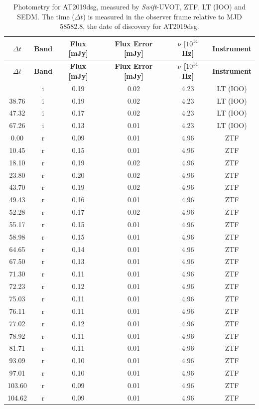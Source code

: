 \documentclass{nature_plusfigure}
\begin{document}
\begin{methods}
\newpage
\begin{longtable}{|c|c|c|c|c|c|}
\caption{Photometry for AT2019dsg, measured by \textit{Swift}-UVOT, ZTF, LT (IOO) and SEDM. The time ($\Delta t$) is measured in the observer frame relative to MJD 58582.8, the date of discovery for AT2019dsg. \label{tab:photometry}}\\
\hline
\textbf{$\Delta{t}$}&\textbf{Band}&\textbf{Flux [mJy]}&\textbf{Flux Error [mJy]}&\textbf{$\nu$ [$10^{14}$ Hz]}&\textbf{Instrument}\\%
\hline%
\endfirsthead
\hline%
\textbf{$\Delta{t}$}&\textbf{Band}&\textbf{Flux [mJy]}&\textbf{Flux Error [mJy]}&\textbf{$\nu$ [$10^{14}$ Hz]}&\textbf{Instrument}\\%
\hline%
\endhead
\hline
\endfoot
\hline
\endlastfoot
\hline%
34.02&i&0.19&0.02&4.23&LT (IOO)\\%
38.76&i&0.19&0.02&4.23&LT (IOO)\\%
47.32&i&0.17&0.02&4.23&LT (IOO)\\%
67.26&i&0.13&0.01&4.23&LT (IOO)\\%
0.00&r&0.09&0.01&4.96&ZTF\\%
10.45&r&0.15&0.01&4.96&ZTF\\%
18.10&r&0.19&0.02&4.96&ZTF\\%
23.80&r&0.20&0.02&4.96&ZTF\\%
43.70&r&0.19&0.02&4.96&ZTF\\%
49.43&r&0.16&0.01&4.96&ZTF\\%
52.28&r&0.17&0.02&4.96&ZTF\\%
55.17&r&0.15&0.01&4.96&ZTF\\%
58.98&r&0.15&0.01&4.96&ZTF\\%
64.65&r&0.14&0.01&4.96&ZTF\\%
67.50&r&0.13&0.01&4.96&ZTF\\%
71.30&r&0.11&0.01&4.96&ZTF\\%
72.23&r&0.12&0.01&4.96&ZTF\\%
75.03&r&0.11&0.01&4.96&ZTF\\%
76.11&r&0.11&0.01&4.96&ZTF\\%
77.02&r&0.12&0.01&4.96&ZTF\\%
78.92&r&0.11&0.01&4.96&ZTF\\%
81.71&r&0.11&0.01&4.96&ZTF\\%
93.09&r&0.10&0.01&4.96&ZTF\\%
97.01&r&0.10&0.01&4.96&ZTF\\%
103.60&r&0.09&0.01&4.96&ZTF\\%
104.62&r&0.09&0.01&4.96&ZTF\\%

\end{longtable}
\end{methods}
\end{document}
